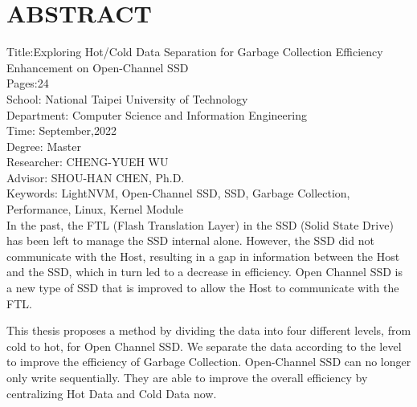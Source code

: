 \chapter*{ABSTRACT}


\noindent
Title:Exploring Hot/Cold Data Separation for Garbage Collection Efficiency Enhancement on Open-Channel SSD\\
Pages:24\\
School: National Taipei University of Technology\\
Department: Computer Science and Information Engineering\\
Time: September,2022\\
Degree: Master\\
Researcher: CHENG-YUEH WU\\
Advisor: SHOU-HAN CHEN, Ph.D.\\
Keywords: LightNVM, Open-Channel SSD, SSD, Garbage Collection, Performance, Linux, Kernel Module\\
\indent
In the past, the FTL (Flash Translation Layer) in the SSD (Solid State Drive) has been left to manage the SSD internal alone. However, the SSD did not communicate with the Host, resulting in a gap in information between the Host and the SSD, which in turn led to a decrease in efficiency. Open Channel SSD is a new type of SSD that is improved to allow the Host to communicate with the FTL.

\indent
This thesis proposes a method by dividing the data into four different levels, from cold to hot, for Open Channel SSD. We separate the data according to the level to improve the efficiency of Garbage Collection. Open-Channel SSD can no longer only write sequentially. They are able to improve the overall efficiency by centralizing Hot Data and Cold Data now.


